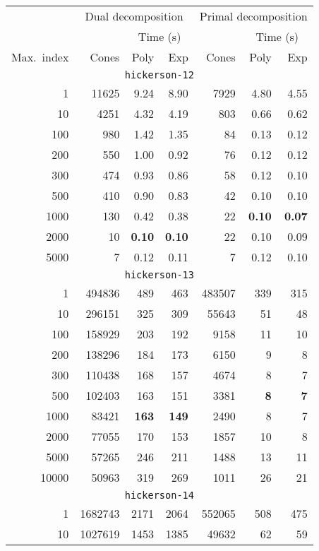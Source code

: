 \begin{table}
\begin{center}
\begin{tabular}{rrrrrrr}
\hline
&
\multicolumn{3}{c}{Dual decomposition} &
\multicolumn{3}{c}{Primal decomposition}
\\
&
& \multicolumn{2}{c}{Time (s)} &
& \multicolumn{2}{c}{Time (s)}
\\
\cline{3-4}
\cline{6-7}
Max.\ index & Cones & Poly & Exp & Cones & Poly & Exp \\
\hline
\multicolumn{7}{c}{{\tt hickerson-12}}
\\
\hline
1 & 11625 & 9.24 & 8.90 & 7929 & 4.80 & 4.55
\\
10 & 4251 & 4.32 & 4.19 & 803 & 0.66 & 0.62
\\
100 & 980 & 1.42 & 1.35 & 84 & 0.13 & 0.12
\\
200 & 550 & 1.00 & 0.92 & 76 & 0.12 & 0.12
\\
300 & 474 & 0.93 & 0.86 & 58 & 0.12 & 0.10
\\
500 & 410 & 0.90 & 0.83 & 42 & 0.10 & 0.10
\\
1000 & 130 & 0.42 & 0.38 & 22 & {\bf 0.10} & {\bf 0.07}
\\
2000 & 10 & {\bf 0.10} & {\bf 0.10} & 22 & 0.10 & 0.09
\\
5000 & 7 & 0.12 & 0.11 & 7 & 0.12 & 0.10
\\
\hline
\multicolumn{7}{c}{{\tt hickerson-13}}
\\
\hline
1 & 494836 & 489 & 463 & 483507 & 339 & 315
\\
10 & 296151 & 325 & 309 & 55643 & 51 & 48
\\
100 & 158929 & 203 & 192 & 9158 & 11 & 10
\\
200 & 138296 & 184 & 173 & 6150 & 9 & 8
\\
300 & 110438 & 168 & 157 & 4674 & 8 & 7
\\
500 & 102403 & 163 & 151 & 3381  & {\bf 8} & {\bf 7}
\\
1000 & 83421 & {\bf 163} & {\bf 149} & 2490 & 8 & 7
\\
2000 & 77055 & 170 & 153 & 1857 & 10 & 8
\\
5000 & 57265 & 246 & 211 & 1488 & 13 & 11
\\
10000 & 50963 & 319 & 269 & 1011 & 26 & 21
\\
\hline
\multicolumn{7}{c}{{\tt hickerson-14}}
\\
\hline
1 & 1682743 & 2171 & 2064 & 552065 & 508 & 475
\\
10 & 1027619 & 1453 & 1385 & 49632 & 62 & 59

\end{tabular}
\end{center}
\end{table}
